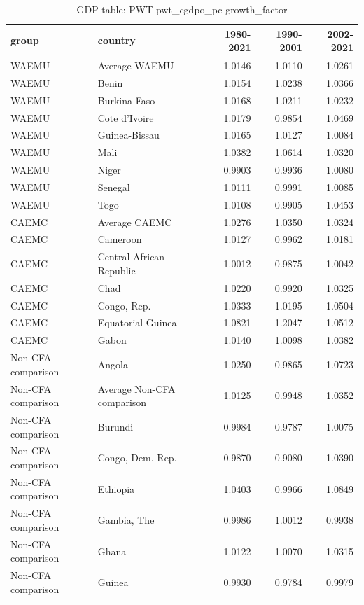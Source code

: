 \begin{table}

\caption{GDP table: PWT pwt_cgdpo_pc growth_factor}
\centering
\begin{tabular}[t]{llrrr}
\toprule
group & country & 1980-2021 & 1990-2001 & 2002-2021\\
\midrule
WAEMU & Average WAEMU & 1.0146 & 1.0110 & 1.0261\\
WAEMU & Benin & 1.0154 & 1.0238 & 1.0366\\
WAEMU & Burkina Faso & 1.0168 & 1.0211 & 1.0232\\
WAEMU & Cote d'Ivoire & 1.0179 & 0.9854 & 1.0469\\
WAEMU & Guinea-Bissau & 1.0165 & 1.0127 & 1.0084\\
\addlinespace
WAEMU & Mali & 1.0382 & 1.0614 & 1.0320\\
WAEMU & Niger & 0.9903 & 0.9936 & 1.0080\\
WAEMU & Senegal & 1.0111 & 0.9991 & 1.0085\\
WAEMU & Togo & 1.0108 & 0.9905 & 1.0453\\
CAEMC & Average CAEMC & 1.0276 & 1.0350 & 1.0324\\
\addlinespace
CAEMC & Cameroon & 1.0127 & 0.9962 & 1.0181\\
CAEMC & Central African Republic & 1.0012 & 0.9875 & 1.0042\\
CAEMC & Chad & 1.0220 & 0.9920 & 1.0325\\
CAEMC & Congo, Rep. & 1.0333 & 1.0195 & 1.0504\\
CAEMC & Equatorial Guinea & 1.0821 & 1.2047 & 1.0512\\
\addlinespace
CAEMC & Gabon & 1.0140 & 1.0098 & 1.0382\\
Non-CFA comparison & Angola & 1.0250 & 0.9865 & 1.0723\\
Non-CFA comparison & Average Non-CFA comparison & 1.0125 & 0.9948 & 1.0352\\
Non-CFA comparison & Burundi & 0.9984 & 0.9787 & 1.0075\\
Non-CFA comparison & Congo, Dem. Rep. & 0.9870 & 0.9080 & 1.0390\\
\addlinespace
Non-CFA comparison & Ethiopia & 1.0403 & 0.9966 & 1.0849\\
Non-CFA comparison & Gambia, The & 0.9986 & 1.0012 & 0.9938\\
Non-CFA comparison & Ghana & 1.0122 & 1.0070 & 1.0315\\
Non-CFA comparison & Guinea & 0.9930 & 0.9784 & 0.9979\\

\end{tabular}
\end{table}
